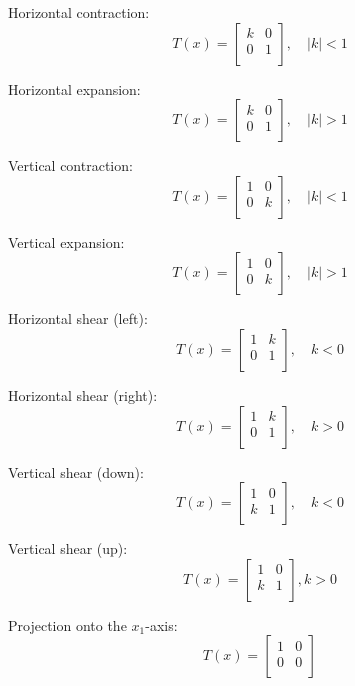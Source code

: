 \documentclass[12pt]{article} %
\begin{document}
Horizontal contraction:
$$T(x) = \begin{bmatrix}
	k & 0\\
	0 & 1\\
\end{bmatrix}, \quad |k| < 1$$

Horizontal expansion:
$$T(x) = \begin{bmatrix}
	k & 0\\
	0 & 1\\
\end{bmatrix}, \quad |k| > 1$$

Vertical contraction:
$$T(x) = \begin{bmatrix}
	1 & 0\\
	0 & k\\
\end{bmatrix}, \quad |k| < 1$$

Vertical expansion:
$$T(x) = \begin{bmatrix}
	1 & 0\\
	0 & k\\
\end{bmatrix}, \quad |k| > 1$$

Horizontal shear (left):
$$T(x) = \begin{bmatrix}
	1 & k\\
	0 & 1\\
\end{bmatrix}, \quad k < 0$$

Horizontal shear (right):
$$T(x) = \begin{bmatrix}
	1 & k\\
	0 & 1\\
\end{bmatrix}, \quad k > 0$$

Vertical shear (down):
$$T(x) = \begin{bmatrix}
	1 & 0\\
	k & 1\\
\end{bmatrix}, \quad k < 0$$

Vertical shear (up):
$$T(x) = \begin{bmatrix}
	1 & 0\\
	k & 1\\
\end{bmatrix}, k > 0$$

Projection onto the $x_1$-axis:
$$T(x) = \begin{bmatrix}
	1 & 0\\
	0 & 0\\
\end{bmatrix}$$
\end{document}
